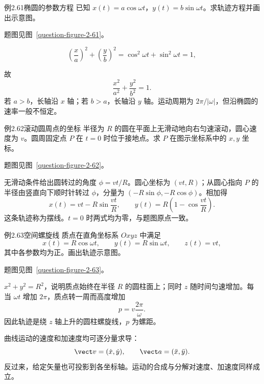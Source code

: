 \ifdefined\Needspace{}\fi
\begin{origexamplebox}{例2.61\quad 椭圆的参数方程}
已知 $x(t)=a\cos\omega t$，$y(t)=b\sin\omega t$。求轨迹方程并画出示意图。
\par 题图见图~\ref{question-figure-2-61}。
\KQuestionCJ
\end{origexamplebox}
\begin{xesolution}
\[
 \left(\frac xa\right)^2+\left(\frac yb\right)^2
 =\cos^2\omega t+\sin^2\omega t=1,
\]
\ParametricEllipseDiagram

故
\[
 \boxed{\frac{x^2}{a^2}+\frac{y^2}{b^2}=1}.
\]
若 $a>b$，长轴沿 $x$ 轴；若 $b>a$，长轴沿 $y$ 轴。运动周期为 $2\pi/|\omega|$，但沿椭圆的速率一般不恒定。
\end{xesolution}

\begin{origexamplebox}{例2.62\quad 滚动圆周点的坐标}
半径为 $R$ 的圆在平面上无滑动地向右匀速滚动，圆心速度为 $v$。圆周固定点 $P$ 在 $t=0$ 时位于接地点。求 $P$ 在图示坐标系中的 $x,y$ 坐标。
\par 题图见图~\ref{question-figure-2-62}。
\KQuestionCK
\end{origexamplebox}
\begin{xesolution}
无滑动条件给出圆转过的角度 $\phi=vt/R$。圆心坐标为 $(vt,R)$；从圆心指向 $P$ 的半径由竖直向下顺时针转过 $\phi$，分量为 $(-R\sin\phi,-R\cos\phi)$。相加得
\CycloidDiagram
\[
 \boxed{x(t)=vt-R\sin\frac{vt}{R}},\qquad
 \boxed{y(t)=R\left(1-\cos\frac{vt}{R}\right)}.
\]
这条轨迹称为摆线。$t=0$ 时两式均为零，与题图原点一致。
\end{xesolution}

\ifdefined\Needspace{}\fi
\begin{origexamplebox}{例2.63\quad 空间螺旋线}
质点在直角坐标系 $Oxyz$ 中满足
\[
x(t)=R\cos\omega t,\qquad y(t)=R\sin\omega t,
\qquad z(t)=vt,
\]
其中各参数均为正。画出轨迹示意图。
\par 题图见图~\ref{question-figure-2-63}。
\KQuestionCL
\end{origexamplebox}
\begin{xesolution}
$x^2+y^2=R^2$，说明质点始终在半径 $R$ 的圆柱面上；同时 $z$ 随时间匀速增加。每当 $\omega t$ 增加 $2\pi$，质点转一周而高度增加
\HelixDiagram
\[
 \boxed{p=v\frac{2\pi}{\omega}}.
\]
因此轨迹是绕 $z$ 轴上升的圆柱螺旋线，$p$ 为螺距。
\end{xesolution}

曲线运动的速度和加速度均可逐分量求导：
\begin{equation}
 \vect v=(\dot x,\dot y),\qquad
 \vect a=(\ddot x,\ddot y).
\end{equation}
反过来，给定矢量也可投影到各坐标轴。运动的合成与分解对速度、加速度同样成立。

